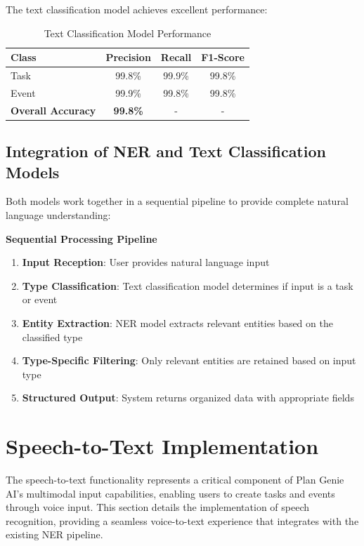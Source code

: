 \documentclass[12pt,a4paper]{article}
\begin{document}
The text classification model achieves excellent performance:

\begin{table}[H]
\centering
\begin{tabular}{|l|c|c|c|}
\hline
\textbf{Class} & \textbf{Precision} & \textbf{Recall} & \textbf{F1-Score} \\
\hline
Task & 99.8\% & 99.9\% & 99.8\% \\
\hline
Event & 99.9\% & 99.8\% & 99.8\% \\
\hline
\textbf{Overall Accuracy} & \textbf{99.8\%} & - & - \\
\hline
\end{tabular}
\caption{Text Classification Model Performance}
\end{table}

\subsection{Integration of NER and Text Classification Models}

Both models work together in a sequential pipeline to provide complete natural language understanding:

\textbf{Sequential Processing Pipeline}

\begin{enumerate}
    \item \textbf{Input Reception}: User provides natural language input
    \item \textbf{Type Classification}: Text classification model determines if input is a task or event
    \item \textbf{Entity Extraction}: NER model extracts relevant entities based on the classified type
    \item \textbf{Type-Specific Filtering}: Only relevant entities are retained based on input type
    \item \textbf{Structured Output}: System returns organized data with appropriate fields
\end{enumerate}

\section{Speech-to-Text Implementation}

The speech-to-text functionality represents a critical component of Plan Genie AI's multimodal input capabilities, enabling users to create tasks and events through voice input. This section details the implementation of speech recognition, providing a seamless voice-to-text experience that integrates with the existing NER pipeline.
\end{document}
